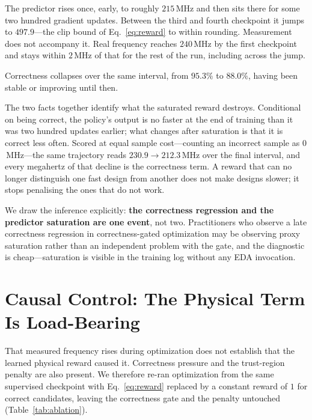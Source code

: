 \documentclass[journal]{IEEEtran}
\begin{document}
The predictor rises once, early, to roughly $215$\,MHz and then sits there for
some two hundred gradient updates. Between the third and fourth checkpoint it
jumps to $497.9$---the clip bound of Eq.~\eqref{eq:reward} to within rounding.
Measurement does not accompany it. Real frequency reaches $240$\,MHz by the
first checkpoint and stays within $2$\,MHz of that for the rest of the run,
including across the jump.

Correctness collapses over the same interval, from $95.3\%$ to $88.0\%$, having
been stable or improving until then.

The two facts together identify what the saturated reward destroys. Conditional
on being correct, the policy's output is no faster at the end of training than
it was two hundred updates earlier; what changes after saturation is that it is
correct less often. Scored at equal sample cost---counting an incorrect sample
as $0$\,MHz---the same trajectory reads $230.9 \rightarrow 212.3$\,MHz over the
final interval, and every megahertz of that decline is the correctness term. A
reward that can no longer distinguish one fast design from another does not
make designs slower; it stops penalising the ones that do not work.

We draw the inference explicitly: \textbf{the correctness regression and the
predictor saturation are one event}, not two. Practitioners who observe a late
correctness regression in correctness-gated optimization may be observing proxy
saturation rather than an independent problem with the gate, and the diagnostic
is cheap---saturation is visible in the training log without any EDA invocation.

\section{Causal Control: The Physical Term Is Load-Bearing
\label{sec:ablation}}

That measured frequency rises during optimization does not establish that the
learned physical reward caused it. Correctness pressure and the trust-region
penalty are also present. We therefore re-ran optimization from the same
supervised checkpoint with Eq.~\eqref{eq:reward} replaced by a constant reward
of $1$ for correct candidates, leaving the correctness gate and the penalty
untouched (Table~\ref{tab:ablation}).
\end{document}
